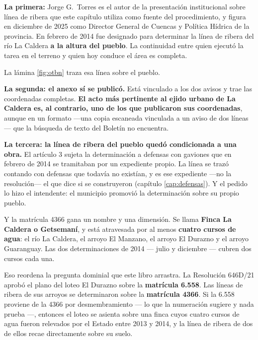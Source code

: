 \begin{cautela}

\textbf{La primera:} Jorge G.\ Torres es el autor de la presentación institucional sobre línea de ribera que este capítulo utiliza como fuente del procedimiento, y figura en diciembre de 2025 como Director General de Cuencas y Política Hídrica de la provincia. En febrero de 2014 fue designado para determinar la línea de ribera del río La Caldera \textbf{a la altura del pueblo}. La continuidad entre quien ejecutó la tarea en el terreno y quien hoy conduce el área es completa.

La lámina \ref{fig:otbn} traza esa línea sobre el pueblo.

\textbf{La segunda: el anexo sí se publicó.} Está vinculado a los dos avisos y trae las coordenadas completas. \textbf{El acto más pertinente al ejido urbano de La Caldera es, al contrario, uno de los que publicaron sus coordenadas}, aunque en un formato ---una copia escaneada vinculada a un aviso de dos líneas--- que la búsqueda de texto del Boletín no encuentra.

\textbf{La tercera: la línea de ribera del pueblo quedó condicionada a una obra.} El artículo 3 sujeta la determinación a defensas con gaviones que en febrero de 2014 se tramitaban por un expediente propio. La línea se trazó contando con defensas que todavía no existían, y es ese expediente ---no la resolución--- el que dice si se construyeron (capítulo \ref{cap:defensas}). Y el pedido lo hizo el intendente: el municipio promovió la determinación sobre su propio pueblo.
\end{cautela}

Y la matrícula 4366 gana un nombre y una dimensión. Se llama \textbf{Finca La Caldera o Getsemaní}, y está atravesada por al menos \textbf{cuatro cursos de agua}: el río La Caldera, el arroyo El Manzano, el arroyo El Durazno y el arroyo Guaranguay. Las dos determinaciones de 2014 --- julio y diciembre --- cubren dos cursos cada una.

Eso reordena la pregunta dominial que este libro arrastra. La Resolución 646D/21 aprobó el plano del loteo El Durazno sobre la \textbf{matrícula 6.558}. Las líneas de ribera de sus arroyos se determinaron sobre la \textbf{matrícula 4366}. Si la 6.558 proviene de la 4366 por desmembramiento --- lo que la numeración sugiere y nada prueba ---, entonces el loteo se asienta sobre una finca cuyos cuatro cursos de agua fueron relevados por el Estado entre 2013 y 2014, y la línea de ribera de dos de ellos recae directamente sobre su suelo.

